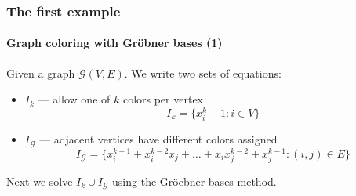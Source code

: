 \documentclass{beamer}
\begin{document}
\begin{frame}
    \frametitle{The first example}
    \framesubtitle{Graph coloring with Gr\"{o}bner bases (1)}

    Given a graph $\mathcal{G}(V, E)$. We write two sets of equations:
    \begin{itemize}
        \item $I_k$ --- allow one of $k$ colors per vertex
            \begin{equation*}
                I_k = \{ x_i^k - 1 : i \in V \}
            \end{equation*}\pause
        \item $I_{\mathcal{G}}$ --- adjacent vertices have different colors assigned
            \begin{equation*}
                I_{\mathcal{G}} = \{ x_{i}^{k-1} + x_{i}^{k-2} x_{j} + \ldots + x_{i} x_{j}^{k-2} + x_{j}^{k-1} : (i, j) \in E \}
            \end{equation*}
    \end{itemize}
    \pause
    Next we solve $I_k \cup I_{\mathcal{G}}$ using the Gr\"{o}ebner bases method.
\end{frame}
\end{document}
